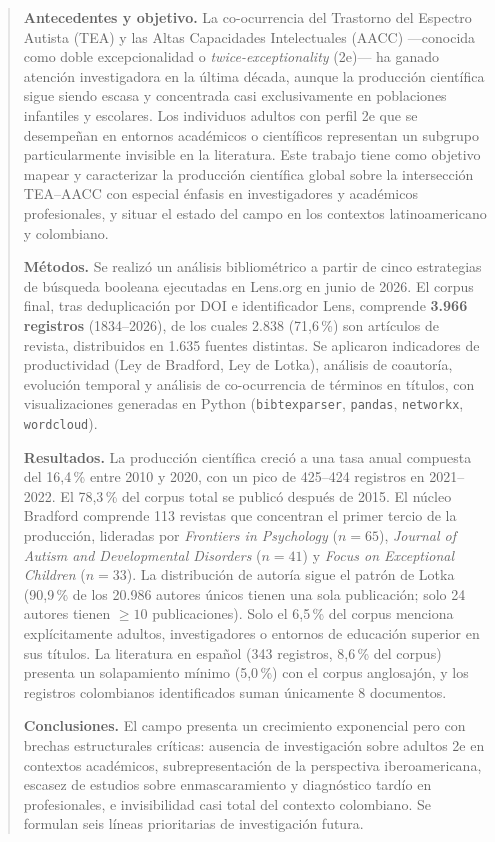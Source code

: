 \documentclass[12pt, a4paper]{article}
\begin{document}
\newpage
\begin{abstract}
\noindent
\textbf{Antecedentes y objetivo.} La co-ocurrencia del Trastorno del Espectro Autista
(TEA) y las Altas Capacidades Intelectuales (AACC) —conocida como doble
excepcionalidad o \textit{twice-exceptionality} (2e)— ha ganado atención investigadora
en la última década, aunque la producción científica sigue siendo escasa y concentrada
casi exclusivamente en poblaciones infantiles y escolares. Los individuos adultos con
perfil 2e que se desempeñan en entornos académicos o científicos representan un
subgrupo particularmente invisible en la literatura. Este trabajo tiene como objetivo
mapear y caracterizar la producción científica global sobre la intersección TEA--AACC
con especial énfasis en investigadores y académicos profesionales, y situar el estado
del campo en los contextos latinoamericano y colombiano.

\noindent
\textbf{Métodos.} Se realizó un análisis bibliométrico a partir de cinco estrategias
de búsqueda booleana ejecutadas en Lens.org en junio de 2026. El corpus final, tras
deduplicación por DOI e identificador Lens, comprende \textbf{3.966 registros} (1834--2026),
de los cuales 2.838 (71,6\,\%) son artículos de revista, distribuidos en 1.635 fuentes
distintas. Se aplicaron indicadores de productividad (Ley de Bradford, Ley de Lotka),
análisis de coautoría, evolución temporal y análisis de co-ocurrencia de términos en
títulos, con visualizaciones generadas en Python (\texttt{bibtexparser}, \texttt{pandas},
\texttt{networkx}, \texttt{wordcloud}).

\noindent
\textbf{Resultados.} La producción científica creció a una tasa anual compuesta del
16,4\,\% entre 2010 y 2020, con un pico de 425--424 registros en 2021--2022. El 78,3\,\%
del corpus total se publicó después de 2015. El núcleo Bradford comprende 113 revistas
que concentran el primer tercio de la producción, lideradas por \textit{Frontiers in
Psychology} ($n=65$), \textit{Journal of Autism and Developmental Disorders} ($n=41$) y
\textit{Focus on Exceptional Children} ($n=33$). La distribución de autoría sigue el
patrón de Lotka (90,9\,\% de los 20.986 autores únicos tienen una sola publicación;
solo 24 autores tienen $\geq10$ publicaciones). Solo el 6,5\,\% del corpus menciona
explícitamente adultos, investigadores o entornos de educación superior en sus
títulos. La literatura en español (343 registros, 8,6\,\% del corpus) presenta un
solapamiento mínimo (5,0\,\%) con el corpus anglosajón, y los registros
colombianos identificados suman únicamente 8 documentos.

\noindent
\textbf{Conclusiones.} El campo presenta un crecimiento exponencial pero con brechas
estructurales críticas: ausencia de investigación sobre adultos 2e en contextos
académicos, subrepresentación de la perspectiva iberoamericana, escasez de estudios
sobre enmascaramiento y diagnóstico tardío en profesionales, e invisibilidad casi
total del contexto colombiano. Se formulan seis líneas prioritarias de investigación
futura.
\end{abstract}
\end{document}
